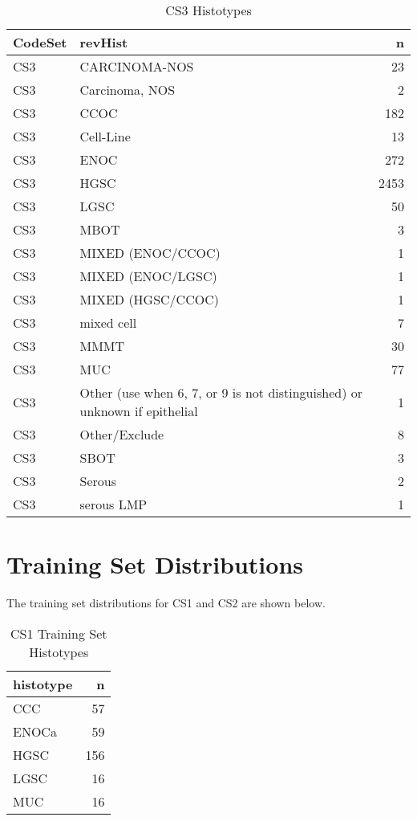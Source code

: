 \documentclass[
]{report}
\begin{document}
\begin{table}

\caption{\label{tab:dist-cs3}CS3 Histotypes}
\centering
\begin{tabular}[t]{l|l|r}
\hline
CodeSet & revHist & n\\
\hline
CS3 & CARCINOMA-NOS & 23\\
\hline
CS3 & Carcinoma, NOS & 2\\
\hline
CS3 & CCOC & 182\\
\hline
CS3 & Cell-Line & 13\\
\hline
CS3 & ENOC & 272\\
\hline
CS3 & HGSC & 2453\\
\hline
CS3 & LGSC & 50\\
\hline
CS3 & MBOT & 3\\
\hline
CS3 & MIXED (ENOC/CCOC) & 1\\
\hline
CS3 & MIXED (ENOC/LGSC) & 1\\
\hline
CS3 & MIXED (HGSC/CCOC) & 1\\
\hline
CS3 & mixed cell & 7\\
\hline
CS3 & MMMT & 30\\
\hline
CS3 & MUC & 77\\
\hline
CS3 & Other (use when 6, 7, or 9 is not distinguished) or unknown if epithelial & 1\\
\hline
CS3 & Other/Exclude & 8\\
\hline
CS3 & SBOT & 3\\
\hline
CS3 & Serous & 2\\
\hline
CS3 & serous LMP & 1\\
\hline
\end{tabular}
\end{table}

\hypertarget{training-set-distributions}{%
\section{Training Set Distributions}\label{training-set-distributions}}

The training set distributions for CS1 and CS2 are shown below.

\begin{table}

\caption{\label{tab:training-dist-cs1}CS1 Training Set Histotypes}
\centering
\begin{tabular}[t]{l|r}
\hline
histotype & n\\
\hline
CCC & 57\\
\hline
ENOCa & 59\\
\hline
HGSC & 156\\
\hline
LGSC & 16\\
\hline
MUC & 16\\
\hline
\end{tabular}
\end{table}
\end{document}
